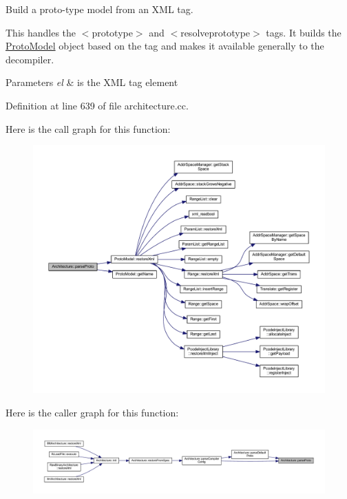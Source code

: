 Build a proto-\/type model from an X\+ML tag. 

This handles the $<$prototype$>$ and $<$resolveprototype$>$ tags. It builds the \mbox{\hyperlink{class_proto_model}{Proto\+Model}} object based on the tag and makes it available generally to the decompiler. 
\begin{DoxyParams}{Parameters}
{\em el} & is the X\+ML tag element \\
\hline
\end{DoxyParams}


Definition at line 639 of file architecture.\+cc.

Here is the call graph for this function\+:
\nopagebreak
\begin{figure}[H]
\begin{center}
\leavevmode
\includegraphics[width=350pt]{class_architecture_afb2938da725012462a68a85627a2dc2c_cgraph}
\end{center}
\end{figure}
Here is the caller graph for this function\+:
\nopagebreak
\begin{figure}[H]
\begin{center}
\leavevmode
\includegraphics[width=350pt]{class_architecture_afb2938da725012462a68a85627a2dc2c_icgraph}
\end{center}
\end{figure}
\mbox{\label{class_architecture_a3e32daad5f4744f55c43f8acdd7ee8eb}} 
